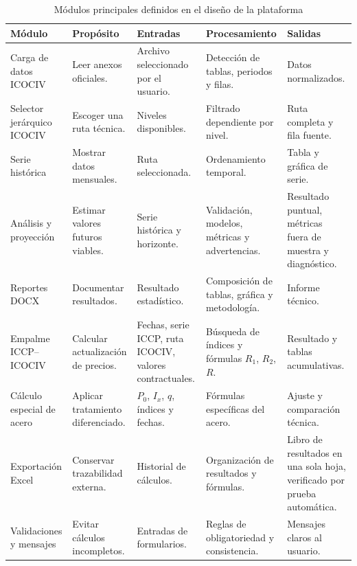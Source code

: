 \documentclass[12pt,letterpaper]{article}
\newcommand{\ICOCIV}{ICOCIV}
\newcommand{\ICCP}{ICCP}
\begin{document}
\begin{table}[H]
\centering
\caption{Módulos principales definidos en el diseño de la plataforma}
\label{tab:modulos_diseno}
\vspace{\baselineskip}
\scriptsize
\begin{adjustbox}{max width=\textwidth}
\begin{tabularx}{\textwidth}{@{}p{3.2cm}YYYY@{}}
\toprule
\textbf{Módulo} & \textbf{Propósito} & \textbf{Entradas} & \textbf{Procesamiento} & \textbf{Salidas} \\
\midrule
Carga de datos \ICOCIV{} & Leer anexos oficiales. & Archivo seleccionado por el usuario. & Detección de tablas, periodos y filas. & Datos normalizados. \\
Selector jerárquico \ICOCIV{} & Escoger una ruta técnica. & Niveles disponibles. & Filtrado dependiente por nivel. & Ruta completa y fila fuente. \\
Serie histórica & Mostrar datos mensuales. & Ruta seleccionada. & Ordenamiento temporal. & Tabla y gráfica de serie. \\
Análisis y proyección & Estimar valores futuros viables. & Serie histórica y horizonte. & Validación, modelos, métricas y advertencias. & Resultado puntual, métricas fuera de muestra y diagnóstico. \\
Reportes DOCX & Documentar resultados. & Resultado estadístico. & Composición de tablas, gráfica y metodología. & Informe técnico. \\
Empalme \ICCP--\ICOCIV{} & Calcular actualización de precios. & Fechas, serie \ICCP, ruta \ICOCIV, valores contractuales. & Búsqueda de índices y fórmulas \(R_1\), \(R_2\), \(R\). & Resultado y tablas acumulativas. \\
Cálculo especial de acero & Aplicar tratamiento diferenciado. & \(P_0\), \(I_x\), \(q\), índices y fechas. & Fórmulas específicas del acero. & Ajuste y comparación técnica. \\
Exportación Excel & Conservar trazabilidad externa. & Historial de cálculos. & Organización de resultados y fórmulas. & Libro de resultados en una sola hoja, verificado por prueba automática. \\
Validaciones y mensajes & Evitar cálculos incompletos. & Entradas de formularios. & Reglas de obligatoriedad y consistencia. & Mensajes claros al usuario. \\
\bottomrule
\end{tabularx}
\end{adjustbox}
\end{table}
\end{document}
